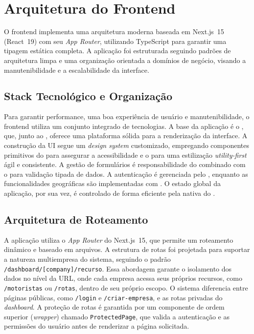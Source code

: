 \section{Arquitetura do Frontend}

O frontend implementa uma arquitetura moderna baseada em Next.js~15 (React~19) com seu \textit{App Router}, utilizando TypeScript para garantir uma tipagem estática completa. A aplicação foi estruturada seguindo padrões de arquitetura limpa e uma organização orientada a domínios de negócio, visando a manutenibilidade e a escalabilidade da interface.

\subsection{Stack Tecnológico e Organização}

Para garantir performance, uma boa experiência de usuário e manutenibilidade, o frontend utiliza um conjunto integrado de tecnologias. A base da aplicação é o , que, junto ao , oferece uma plataforma sólida para a renderização da interface. A construção da UI segue um \textit{design system} customizado, empregando componentes primitivos do  para assegurar a acessibilidade e o  para uma estilização \textit{utility-first} ágil e consistente. A gestão de formulários é responsabilidade do  combinado com o  para validação tipada de dados. A autenticação é gerenciada pelo , enquanto as funcionalidades geográficas são implementadas com . O estado global da aplicação, por sua vez, é controlado de forma eficiente pela  nativa do .

\subsection{Arquitetura de Roteamento}

A aplicação utiliza o \textit{App Router} do Next.js~15, que permite um roteamento dinâmico e baseado em arquivos. A estrutura de rotas foi projetada para suportar a natureza multiempresa do sistema, seguindo o padrão \texttt{/dashboard/[company]/recurso}. Essa abordagem garante o isolamento dos dados no nível da URL, onde cada empresa acessa seus próprios recursos, como \texttt{/motoristas} ou \texttt{/rotas}, dentro de seu próprio escopo. O sistema diferencia entre páginas públicas, como \texttt{/login} e \texttt{/criar-empresa}, e as rotas privadas do \textit{dashboard}. A proteção de rotas é garantida por um componente de ordem superior (\textit{wrapper}) chamado \texttt{ProtectedPage}, que valida a autenticação e as permissões do usuário antes de renderizar a página solicitada.

